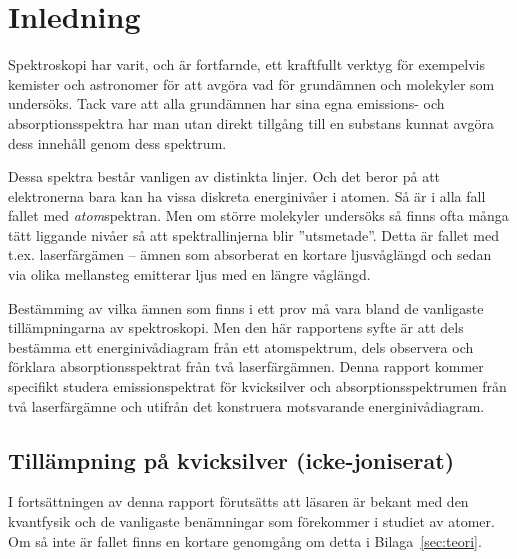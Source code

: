 \documentclass[11pt,a4paper]{article}
\begin{document}





\section{Inledning}
Spektroskopi har varit, och är fortfarnde, ett kraftfullt verktyg för
exempelvis kemister och astronomer för att avgöra vad för grundämnen
och molekyler som undersöks. Tack vare att alla grundämnen har sina
egna emissions- och absorptionsspektra har man utan direkt
tillgång till en substans kunnat avgöra dess innehåll genom dess
spektrum. 

Dessa spektra består vanligen av distinkta linjer. Och det beror på
att elektronerna bara kan ha vissa diskreta energinivåer i atomen. Så
är i alla fall fallet med \emph{atom}spektran. Men om större molekyler
undersöks så finns ofta många tätt liggande nivåer så att
spektrallinjerna blir ''utsmetade''. Detta är fallet med
t.ex. laserfärgämen -- ämnen som absorberat en kortare ljusvåglängd
och sedan via olika mellansteg emitterar ljus med en längre våglängd.

Bestämming av vilka ämnen som finns i ett prov må vara bland de
vanligaste tillämpningarna av spektroskopi. Men den här rapportens
syfte är att dels bestämma ett energinivådiagram från ett
atomspektrum, dels observera och förklara absorptionsspektrat från två
laserfärgämnen.  Denna rapport kommer specifikt studera
emissionspektrat för kvicksilver\footnotemark{} och
absorptionsspektrumen från två laserfärgämne och utifrån det
konstruera motsvarande energinivådiagram. 


\subsection{Tillämpning på kvicksilver (icke-joniserat)}
I fortsättningen av denna rapport förutsätts att läsaren är bekant med
den kvantfysik och de vanligaste benämningar som förekommer i studiet
av atomer. Om så inte är fallet finns en kortare genomgång om detta i
Bilaga~\ref{sec:teori}.
\end{document}

